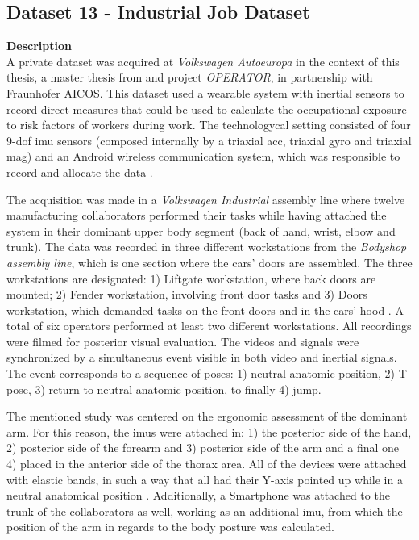 \subsection{Dataset 13 - Industrial Job Dataset}
\label{dat:dataset_industry}
\textbf{Description}\hfill \\
A private dataset was acquired at \textit{Volkswagen Autoeuropa} in the context of this thesis, a master thesis from \cite{santos2019} and project \textit{OPERATOR}, in partnership with Fraunhofer AICOS. This dataset used a wearable system with inertial sensors to record direct measures that could be used to calculate the occupational exposure to risk factors of workers during work. The technologycal setting consisted of four 9-\gls{dof} \gls{imu} sensors (composed internally by a triaxial \gls{acc}, triaxial \gls{gyro} and triaxial \gls{mag}) and an Android wireless communication system, which was responsible to record and allocate the data \cite{santos2019}.
\par
The acquisition was made in a \textit{Volkswagen Industrial} assembly line where twelve manufacturing collaborators performed their tasks while having attached the system in their dominant upper body segment (back of hand, wrist, elbow and trunk). The data was recorded in three different workstations from the \textit{Bodyshop assembly line}, which is one section where the cars' doors are assembled. The three workstations are designated: 1) Liftgate workstation, where back doors are mounted; 2) Fender workstation, involving front door tasks and 3) Doors workstation, which demanded tasks on the front doors and in the cars' hood \cite{santos2019}. A total of six operators performed at least two different workstations. All recordings were filmed for posterior visual evaluation. The videos and signals were synchronized by a simultaneous event visible in both video and inertial signals. The event corresponds to a sequence of poses: 1) neutral anatomic position, 2) T pose, 3) return to neutral anatomic position, to finally 4) jump.

The mentioned study was centered on the ergonomic assessment of the dominant arm. For this reason, the \gls{imu}s  were attached in: 1) the posterior side of the hand, 2) posterior side of the forearm and 3) posterior side of the arm and a final one 4) placed in the anterior side of the thorax area. All of the devices were attached with elastic bands, in such a way that all had their Y-axis pointed up while in a neutral anatomical position \cite{santos2019}. Additionally, a Smartphone was attached to the trunk of the collaborators as well, working as an additional \gls{imu}, from which the position of the arm in regards to the body posture was calculated.

